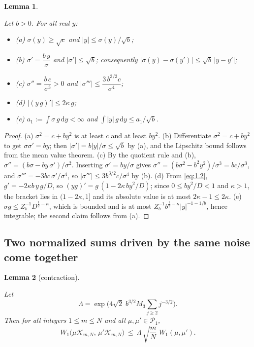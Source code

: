 \documentclass[aip,jmp,preprint,onecolumn,floatfix,superscriptaddress,nofootinbib,11pt]{revtex4-2}
\theoremstyle{plain}
\newtheorem{lemma}{Lemma}
\theoremstyle{remark}
\numberwithin{equation}{section}
\newcommand{\dd}{\mathrm{d}}
\begin{document}
\begin{lemma}\label{lem:4}
 
Let $b>0$. For all real $y$:
%
\begin{itemize}
\item(a) $\sigma(y)\ge\sqrt c$ and $|y|\le\sigma(y)/\sqrt b$;
\item(b) $\sigma'=\dfrac{b\,y}{\sigma}$ and $|\sigma'|\le\sqrt b$; consequently $|\sigma(y)-\sigma(y')|\le\sqrt b\,|y-y'|$;
\item(c) $\sigma''=\dfrac{b\,c}{\sigma^{3}}>0$ and $|\sigma'''|\le\dfrac{3\,b^{3/2}c}{\sigma^{4}}$;
\item(d) $\big|(y\,g)'\big|\le2\kappa\,g$;
\item(e) $a_1:=\displaystyle\int\sigma\,g\,\dd y<\infty$ and $\displaystyle\int|y|\,g\,\dd y\le a_1/\sqrt b$.
\end{itemize}
 
\end{lemma}
 
\begin{proof} (a) $\sigma^{2}=c+by^{2}$ is at least $c$ and at least $by^{2}$. (b) Differentiate $\sigma^{2}=c+by^{2}$ to get $\sigma\sigma'=by$; then $|\sigma'|=b|y|/\sigma\le\sqrt b$ by (a), and the Lipschitz bound follows from the mean value theorem. (c) By the quotient rule and (b), $\sigma''=(b\sigma-by\,\sigma')/\sigma^{2}$. Inserting $\sigma'=by/\sigma$ gives $\sigma''=(b\sigma^{2}-b^{2}y^{2})/\sigma^{3}=bc/\sigma^{3}$, and $\sigma'''=-3bc\,\sigma'/\sigma^{4}$, so $|\sigma'''|\le3b^{3/2}c/\sigma^{4}$ by (b). (d) From \eqref{eq:1.2}, $g'=-2\kappa b\,y\,g/D$, so $(yg)'=g\,(1-2\kappa\,by^{2}/D)$; since $0\le by^{2}/D<1$ and $\kappa>1$, the bracket lies in $(1-2\kappa,1]$ and its absolute value is at most $2\kappa-1\le2\kappa$. (e) $\sigma g\le Z_b^{-1}D^{\frac12-\kappa}$, which is bounded and is at most $Z_b^{-1}b^{\frac12-\kappa}|y|^{-1-1/b}$, hence integrable; the second claim follows from (a). 
\end{proof}
 
\subsection{Two normalized sums driven by the same noise come together}\label{sec:4_4}
 
\begin{lemma}[contraction]\label{lem:5}
 
Let
%
\begin{equation}
\Lambda=\exp\Big(4\sqrt2\;b^{3/2}M_3\sum_{j\ge2}j^{-3/2}\Big).
\label{eq:4.4}
\end{equation}
%
Then for all integers $1\le m\le N$ and all $\mu,\mu'\in\mathcal P_1$,
%
\begin{equation}
W_1\big(\mu \mathcal K_{m,N},\,\mu' \mathcal K_{m,N}\big)\ \le\ \Lambda\,\sqrt{\frac mN}\;W_1(\mu,\mu').
\label{eq:4.5}
\end{equation}
 
\end{lemma}
 
\end{document}
